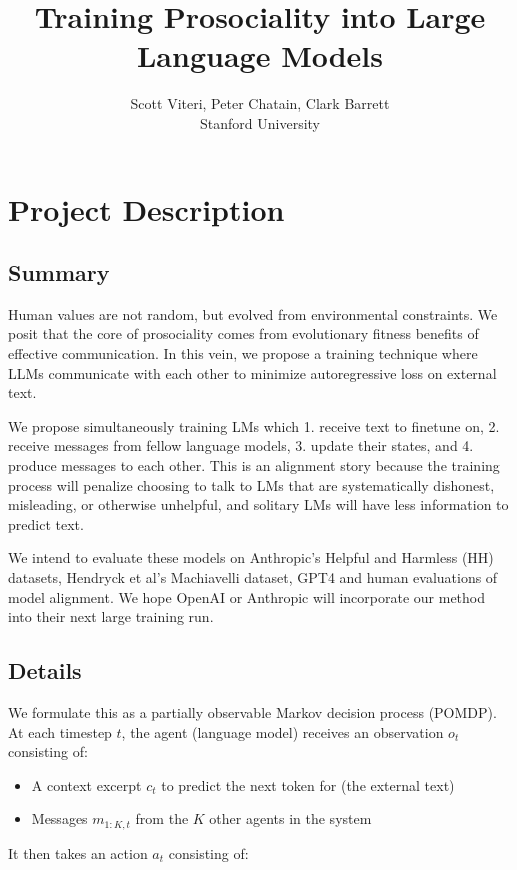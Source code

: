 \documentclass{article}
\title{Training Prosociality into Large Language Models}
\author{Scott Viteri, Peter Chatain, Clark Barrett\\Stanford University}
\date{}
\begin{document}
\maketitle

\section{Project Description}

\subsection{Summary}

Human values are not random, but evolved from environmental constraints. We posit that the core of prosociality comes from evolutionary fitness benefits of effective communication. In this vein, we propose a training technique where LLMs communicate with each other to minimize autoregressive loss on external text.

We propose simultaneously training LMs which 1. receive text to finetune on, 2. receive messages from fellow language models, 3. update their states, and 4. produce messages to each other. This is an alignment story because the training process will penalize choosing to talk to LMs that are systematically dishonest, misleading, or otherwise unhelpful, and solitary LMs will have less information to predict text.

We intend to evaluate these models on Anthropic's Helpful and Harmless (HH) datasets, Hendryck et al's Machiavelli dataset, GPT4 and human evaluations of model alignment. We hope OpenAI or Anthropic will incorporate our method into their next large training run.

\subsection{Details}

We formulate this as a partially observable Markov decision process (POMDP). At each timestep $t$, the agent (language model) receives an observation $o_t$ consisting of:

\begin{itemize}
\item A context excerpt $c_t$ to predict the next token for (the external text)
\item Messages $m_{1:K, t}$ from the $K$ other agents in the system
\end{itemize}

It then takes an action $a_t$ consisting of:
\end{document}

